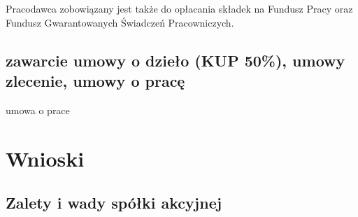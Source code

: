 \documentclass[a4paper, 11pt]{article}
\begin{document}
Pracodawca zobowiązany jest także do opłacania składek na Fundusz Pracy oraz Fundusz Gwarantowanych Świadczeń Pracowniczych.

\subsection{zawarcie umowy o dzieło (KUP 50\%), umowy zlecenie, umowy o pracę}
umowa o prace
\section{Wnioski}
 
\subsection{Zalety i wady spółki akcyjnej}
\indent
\end{document}
